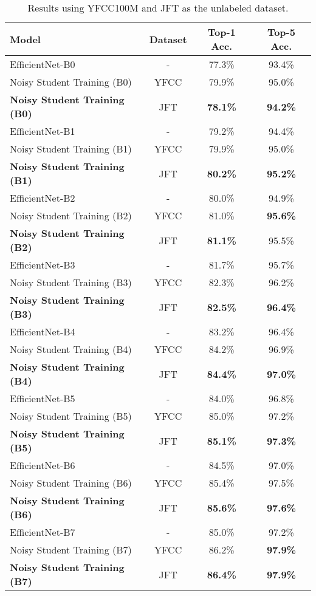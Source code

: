 \documentclass[10pt,twocolumn,letterpaper]{article}
\begin{document}
\begin{table}[h!]
    \centering
    \footnotesize
    \begin{tabular}{l|c|cc}
    \toprule
         Model & Dataset & Top-1 Acc. & Top-5 Acc. \\
         \midrule 
         EfficientNet-B0 & - & 77.3\% & 93.4\%  \\
         Noisy Student Training (B0) & YFCC & 79.9\%  & 95.0\% \\
         \bf Noisy Student Training (B0) & JFT & \bf 78.1\%  & \bf 94.2\% \\
         \midrule
         EfficientNet-B1 & - & 79.2\% & 94.4\%  \\
         Noisy Student Training (B1) & YFCC & 79.9\% & 95.0\% \\
         \bf Noisy Student Training (B1) & JFT & \bf 80.2\% & \bf 95.2\% \\
         \midrule
         EfficientNet-B2 & - & 80.0\% & 94.9\% \\
         Noisy Student Training (B2) & YFCC & 81.0\% & \bf 95.6\% \\
         \bf Noisy Student Training (B2) & JFT & \bf 81.1\% & 95.5\% \\
         \midrule
         EfficientNet-B3 & - & 81.7\% & 95.7\%  \\
         Noisy Student Training (B3) & YFCC & 82.3\% & 96.2\% \\
         \bf Noisy Student Training (B3) & JFT & \bf 82.5\% & \bf 96.4\% \\
         \midrule
         EfficientNet-B4 & - & 83.2\% &  96.4\% \\
         Noisy Student Training (B4) & YFCC & 84.2\% & 96.9\%  \\
         \bf Noisy Student Training (B4) & JFT & \bf 84.4\% & \bf 97.0\%  \\
         \midrule
         EfficientNet-B5 & - & 84.0\% & 96.8\%  \\
         Noisy Student Training (B5) & YFCC &  85.0\%  & 97.2\% \\
         \bf Noisy Student Training (B5) & JFT & \bf 85.1\%  &  \bf 97.3\% \\
         \midrule
         EfficientNet-B6 & - & 84.5\% & 97.0\%  \\
         Noisy Student Training (B6) & YFCC & 85.4\% & 97.5\% \\
         \bf Noisy Student Training (B6) & JFT & \bf 85.6\% & \bf 97.6\% \\
         \midrule
         EfficientNet-B7 & - & 85.0\% & 97.2\%  \\
         Noisy Student Training (B7) & YFCC &  86.2\% &  \bf 97.9\% \\
         \bf Noisy Student Training (B7) & JFT &  \bf 86.4\% & \bf 97.9\% \\
         \bottomrule
    \end{tabular}
    \caption{Results using YFCC100M and JFT as the unlabeled dataset. }
    \label{tab:results_yfcc}
\end{table}
\end{document}
